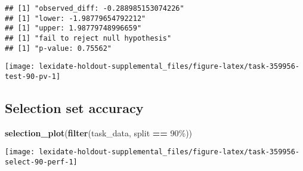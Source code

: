 \documentclass[
]{book}
\newenvironment{Shaded}{\begin{snugshade}}{\end{snugshade}}
\newcommand{\AttributeTok}[1]{\textcolor[rgb]{0.13,0.29,0.53}{#1}}
\newcommand{\DecValTok}[1]{\textcolor[rgb]{0.00,0.00,0.81}{#1}}
\newcommand{\FunctionTok}[1]{\textcolor[rgb]{0.13,0.29,0.53}{\textbf{#1}}}
\newcommand{\NormalTok}[1]{#1}
\newcommand{\OtherTok}[1]{\textcolor[rgb]{0.56,0.35,0.01}{#1}}
\newcommand{\SpecialCharTok}[1]{\textcolor[rgb]{0.81,0.36,0.00}{\textbf{#1}}}
\newcommand{\StringTok}[1]{\textcolor[rgb]{0.31,0.60,0.02}{#1}}
\begin{document}
\begin{Shaded}
\end{Shaded}

\begin{verbatim}
## [1] "observed_diff: -0.288985153074226"
## [1] "lower: -1.98779654792212"
## [1] "upper: 1.98779748996659"
## [1] "fail to reject null hypothesis"
## [1] "p-value: 0.75562"
\end{verbatim}

\texttt{[image: lexidate-holdout-supplemental\_files/figure-latex/task-359956-test-90-pv-1]}

\hypertarget{selection-set-accuracy-28}{%
\subsection{Selection set accuracy}\label{selection-set-accuracy-28}}

\begin{Shaded}
\begin{Highlighting}[]
\FunctionTok{selection\_plot}\NormalTok{(}\FunctionTok{filter}\NormalTok{(task\_data, split }\SpecialCharTok{==} \StringTok{\textquotesingle{}90\%\textquotesingle{}}\NormalTok{))}
\end{Highlighting}
\end{Shaded}

\texttt{[image: lexidate-holdout-supplemental\_files/figure-latex/task-359956-select-90-perf-1]}
\end{document}
